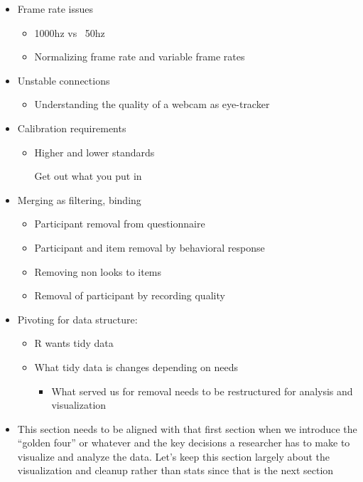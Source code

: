 \begin{itemize}
\item  	Frame rate issues
\begin{itemize}
\item  1000hz vs ~50hz
\item  Normalizing frame rate and variable frame rates
\end{itemize}
\item  Unstable connections
\begin{itemize}
\item   Understanding the quality of a webcam as eye-tracker
\end{itemize}
\item 	Calibration requirements
\begin{itemize}
\item  Higher and lower standards
\begin{itemize}
Get out what you put in
\end{itemize}
\end{itemize}
\item Merging as filtering, binding
\begin{itemize}
\item  Participant removal from questionnaire
\item Participant and item removal by behavioral response
\item Removing non looks to items
\item Removal of participant by recording quality
\end{itemize}
\item  	Pivoting for data structure:
\begin{itemize}
\item   R wants tidy data
\item   What tidy data is changes depending on needs
\begin{itemize}
\item What served us for removal needs to be restructured for analysis and visualization
\end{itemize}
\end{itemize}
\end{itemize}
\begin{itemize}
\item This section needs to be aligned with that first section when we introduce the “golden four” or whatever and the key decisions a researcher has to make to visualize and analyze the data. Let’s keep this section largely about the visualization and cleanup rather than stats since that is the next section
\end{itemize}


